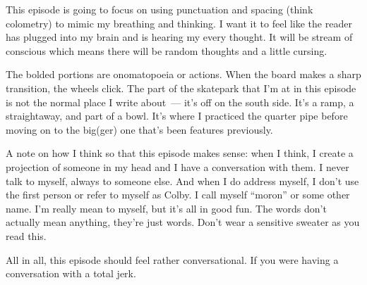 This episode is going to focus on using punctuation and spacing (think colometry) to mimic my breathing and thinking. I want it to feel like the reader has plugged into my brain and is hearing my every thought. It will be stream of conscious which means there will be random thoughts and a little cursing.

The bolded portions are onomatopoeia or actions. When the board makes a sharp transition, the wheels click. The part of the skatepark that I'm at in this episode is not the normal place I write about~--- it's off on the south side. It's a ramp, a straightaway, and part of a bowl. It's where I practiced the quarter pipe before moving on to the big(ger) one that's been features previously.

A note on how I think so that this episode makes sense: when I think, I create a projection of someone in my head and I have a conversation with them. I never talk to myself, always to someone else. And when I do address myself, I don't use the first person or refer to myself as Colby. I call myself ``moron'' or some other name. I'm really mean to myself, but it's all in good fun. The words don't actually mean anything, they're just words. Don't wear a sensitive sweater as you read this.

All in all, this episode should feel rather conversational. If you were having a conversation with a total jerk.
